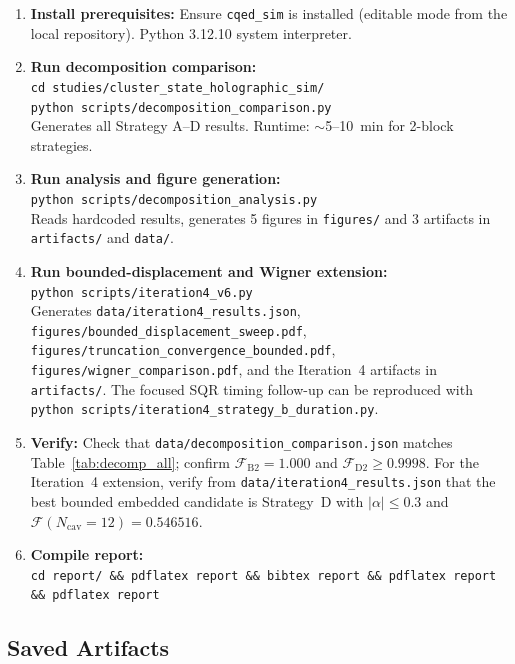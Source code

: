 \documentclass[aps,pra,twocolumn,reprint,floatfix,amsmath,amssymb]{revtex4-2}
\begin{document}
\begin{enumerate}
  \item \textbf{Install prerequisites:}
    Ensure \texttt{cqed\_sim} is installed (editable mode from
    the local repository).  Python 3.12.10 system interpreter.
  \item \textbf{Run decomposition comparison:}\\
    \texttt{cd studies/cluster\_state\_holographic\_sim/}\\
    \texttt{python scripts/decomposition\_comparison.py}\\
    Generates all Strategy A--D results.  Runtime: $\sim$5--10~min
    for 2-block strategies.
  \item \textbf{Run analysis and figure generation:}\\
    \texttt{python scripts/decomposition\_analysis.py}\\
    Reads hardcoded results, generates 5 figures in
    \texttt{figures/} and 3 artifacts in \texttt{artifacts/}
    and \texttt{data/}.
  \item \textbf{Run bounded-displacement and Wigner extension:}\\
    \texttt{python scripts/iteration4\_v6.py}\\
    Generates \texttt{data/iteration4\_results.json},
    \texttt{figures/bounded\_displacement\_sweep.pdf},
    \texttt{figures/truncation\_convergence\_bounded.pdf},
    \texttt{figures/wigner\_comparison.pdf}, and the Iteration~4
    artifacts in \texttt{artifacts/}.  The focused SQR timing
    follow-up can be reproduced with
    \texttt{python scripts/iteration4\_strategy\_b\_duration.py}.
  \item \textbf{Verify:}
    Check that \texttt{data/decomposition\_comparison.json} matches
    Table~\ref{tab:decomp_all}; confirm
    $\mathcal{F}_\mathrm{B2}=1.000$ and
    $\mathcal{F}_\mathrm{D2}\geq0.9998$.  For the Iteration~4
    extension, verify from \texttt{data/iteration4\_results.json}
    that the best bounded embedded candidate is
    Strategy~D with $|\alpha|\leq 0.3$ and
    $\mathcal{F}(N_\mathrm{cav}=12)=0.546516$.
  \item \textbf{Compile report:}\\
    \texttt{cd report/ \&\& pdflatex report \&\& bibtex report
    \&\& pdflatex report \&\& pdflatex report}
\end{enumerate}

\subsection{Saved Artifacts}
\end{document}
